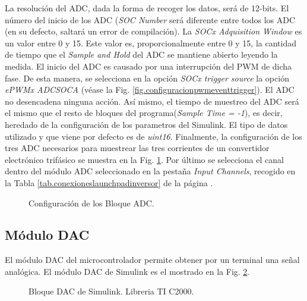 \documentclass{report}
\begin{document}
La resolución del ADC, dada la forma de recoger los datos, será de 12-bits. El número del inicio de los ADC (\textit{SOC Number} será diferente entre todos los ADC (en su defecto, saltará un error de compilación). La \textit{SOCx Adquisition Window} es un valor entre 0 y 15. Este valor es, proporcionalmente entre 0 y 15, la cantidad de tiempo que el \textit{Sample and Hold} del ADC se mantiene abierto leyendo la medida. El inicio del ADC es causado por una interrupción del PWM de dicha fase. De esta manera, se selecciona en la opción \textit{SOCx trigger source} la opción \textit{ePWMx ADCSOCA}  (véase la Fig. \ref{fig.configuracionpwmeventtrigger}). El ADC no desencadena ninguna acción. Así mismo, el tiempo de muestreo del ADC será el mismo que el resto de bloques del programa(\textit{Sample Time = -1}), es decir, heredado de la configuración de los parametros del Simulink. El tipo de datos utilizado y que viene por defecto es de \textit{uint16}. Finalmente, la configuración de los tres ADC necesarios para muestrear las tres corrientes de un convertidor electrónico trifásico se muestra  en la Fig. \ref{fig.configuracionadc_3}. Por último se selecciona el canal dentro del módulo ADC seleccionado en la pestaña \textit{Input Channels}, recogido en la Tabla \ref{tab.conexioneslaunchpadinversor} de la página \pageref{tab.conexioneslaunchpadinversor}.

\begin{figure}[!h]
    \begin{center}
    \caption{Configuración de los Bloque ADC.}
    \label{fig.configuracionadc_3} 
    \end{center}
\end{figure}


\clearpage
\subsection{Módulo DAC} \label{sec.moduloDAC}

El módulo DAC del microcontrolador permite obtener por un terminal una señal analógica. El módulo DAC de Simulink es el mostrado en la Fig. \ref{fig.dac}.

\begin{figure}[!h]
    \begin{center}
    \caption{Bloque DAC de Simulink. Libreria TI C2000.}
    \label{fig.dac} 
    \end{center}
\end{figure}
\end{document}
